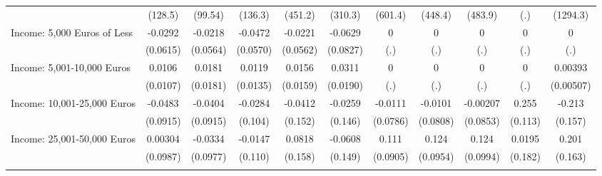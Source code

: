 {\begin{tabular}{l*{10}{c}}
            &     (128.5)         &     (99.54)         &     (136.3)         &     (451.2)         &     (310.3)         &     (601.4)         &     (448.4)         &     (483.9)         &         (.)         &    (1294.3)         \\
\addlinespace
Income: 5,000 Euros of Less&     -0.0292         &     -0.0218         &     -0.0472         &     -0.0221         &     -0.0629         &           0         &           0         &           0         &           0         &           0         \\
            &    (0.0615)         &    (0.0564)         &    (0.0570)         &    (0.0562)         &    (0.0827)         &         (.)         &         (.)         &         (.)         &         (.)         &         (.)         \\
\addlinespace
Income: 5,001-10,000 Euros&      0.0106         &      0.0181         &      0.0119         &      0.0156         &      0.0311         &           0         &           0         &           0         &           0         &     0.00393         \\
            &    (0.0107)         &    (0.0181)         &    (0.0135)         &    (0.0159)         &    (0.0190)         &         (.)         &         (.)         &         (.)         &         (.)         &   (0.00507)         \\
\addlinespace
Income: 10,001-25,000 Euros&     -0.0483         &     -0.0404         &     -0.0284         &     -0.0412         &     -0.0259         &     -0.0111         &     -0.0101         &    -0.00207         &       0.255\sym{*}  &      -0.213         \\
            &    (0.0915)         &    (0.0915)         &     (0.104)         &     (0.152)         &     (0.146)         &    (0.0786)         &    (0.0808)         &    (0.0853)         &     (0.113)         &     (0.157)         \\
\addlinespace
Income: 25,001-50,000 Euros&     0.00304         &     -0.0334         &     -0.0147         &      0.0818         &     -0.0608         &       0.111         &       0.124         &       0.124         &      0.0195         &       0.201         \\
            &    (0.0987)         &    (0.0977)         &     (0.110)         &     (0.158)         &     (0.149)         &    (0.0905)         &    (0.0954)         &    (0.0994)         &     (0.182)         &     (0.163)         \\
\addlinespace

\end{tabular}}
